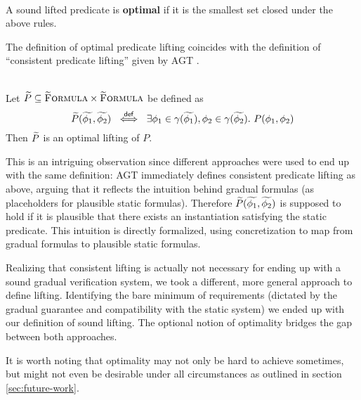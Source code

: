 \begin{definition}~\\
    A sound lifted predicate is \textbf{optimal} if it is the smallest set closed under the above rules.
\end{definition}

The definition of optimal predicate lifting coincides with the definition of “consistent predicate lifting” given by AGT \cite{garcia2016abstracting}.
\begin{lemma}
    \label{lemma:consistent-pred-lifting-direct}~\\
    Let $\widetilde{P} \subseteq \textup{\textsc{\ensuremath{\widetilde{\text{F}}}ormula}} \times \textup{\textsc{\ensuremath{\widetilde{\text{F}}}ormula}}$ be defined as
    \begin{displaymath} 
    \widetilde{P}(\widetilde{\phi_1}, \widetilde{\phi_2}) ~\overset{\textup{\textmd{\textsf{def}}}}{\iff}~ \exists \phi_1 \in \gamma(\widetilde{\phi_1}), \phi_2 \in \gamma(\widetilde{\phi_2}).~ P(\phi_1, \phi_2)
    \end{displaymath}
    Then $\widetilde{P}$ is an optimal lifting of $P$.
\end{lemma} %
This is an intriguing observation since different approaches were used to end up with the same definition:
AGT immediately defines consistent predicate lifting as above, arguing that it reflects the intuition behind gradual formulas (as placeholders for plausible static formulas).
Therefore $\widetilde{P}(\widetilde{\phi_1}, \widetilde{\phi_2})$ is supposed to hold if it is plausible that there exists an instantiation satisfying the static predicate.
This intuition is directly formalized, using concretization to map from gradual formulas to plausible static formulas.

\begin{comment}
We noticed early that this definition is too strong for gradual verification rules in general, due to the complexity of verification rules compared to typing rules:
A judgment $\thoare{}{\phi_1}{s}{\phi_2}$ (note that $s$ may be a sequence, contain method calls, etc.) 

In chapter \ref{sec:abstracting-static-semantics} we will see examples of gradual predicates which are not optimal and would thus not fit into AGT's model of consistent lifting.
\end{comment}

Realizing that consistent lifting is actually not necessary for ending up with a sound gradual verification system, we took a different, more general approach to define lifting.
Identifying the bare minimum of requirements (dictated by the gradual guarantee and compatibility with the static system) we ended up with our definition of sound lifting.
The optional notion of optimality bridges the gap between both approaches.

It is worth noting that optimality may not only be hard to achieve sometimes, but might not even be desirable under all circumstances as outlined in section \ref{sec:future-work}.

